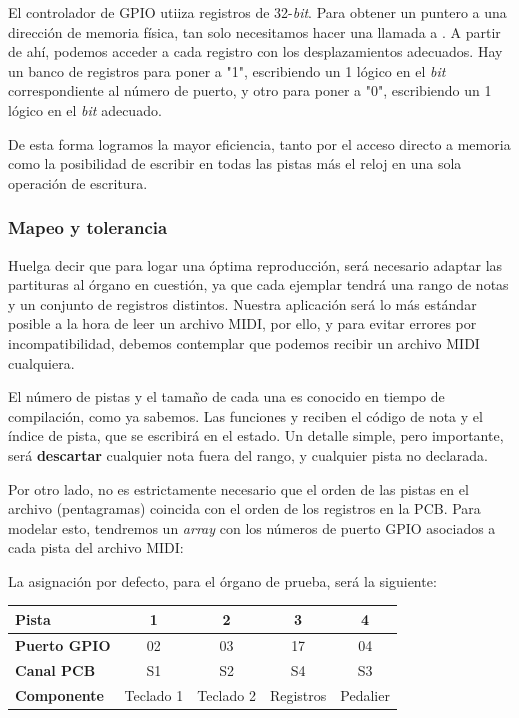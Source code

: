 \smallskip

El controlador de \acrshort{GPIO} utiiza registros de 32-\textit{bit}. Para obtener un puntero a una dirección de memoria física, tan solo necesitamos hacer una llamada a  \cite{soii}. A partir de ahí, podemos acceder a cada registro con los desplazamientos adecuados. Hay un banco de registros para poner a "1", escribiendo un 1 lógico en el \textit{bit} correspondiente al número de puerto, y otro para poner a "0", escribiendo un 1 lógico en el \textit{bit} adecuado.

De esta forma logramos la mayor eficiencia, tanto por el acceso directo a memoria como la posibilidad de escribir en todas las pistas más el reloj en una sola operación de escritura.

\subsubsection{Mapeo y tolerancia}

Huelga decir que para logar una óptima reproducción, será necesario adaptar las partituras al órgano en cuestión, ya que cada ejemplar tendrá una rango de notas y un conjunto de registros distintos. Nuestra aplicación será lo más estándar posible a la hora de leer un archivo \acrshort{MIDI}, por ello, y para evitar errores por incompatibilidad, debemos contemplar que podemos recibir un archivo \acrshort{MIDI} cualquiera.

El número de pistas y el tamaño de cada una es conocido en tiempo de compilación, como ya sabemos. Las funciones  y  reciben el código de nota y el índice de pista, que se escribirá en el estado. Un detalle simple, pero importante, será \textbf{descartar} cualquier nota fuera del rango, y cualquier pista no declarada.

Por otro lado, no es estrictamente necesario que el orden de las pistas en el archivo (pentagramas) coincida con el orden de los registros en la \acrshort{PCB}. Para modelar esto, tendremos un \textit{array} con los números de puerto \acrshort{GPIO} asociados a cada pista del archivo \acrshort{MIDI}:

La asignación por defecto, para el órgano de prueba, será la siguiente:

\smallskip

\begin{center}
	\begin{tabular}{|l|c|c|c|c|}
		\hline \textbf{Pista} & 1 & 2 & 3 & 4 \\
		\hline \textbf{Puerto GPIO} & 02 & 03 & 17 & 04 \\
		\hline \textbf{Canal PCB} & S1 & S2 & S4 & S3 \\
		\hline \textbf{Componente} & Teclado 1 & Teclado 2 & Registros & Pedalier \\
		\hline 
	\end{tabular}
	\smallskip
\end{center}

